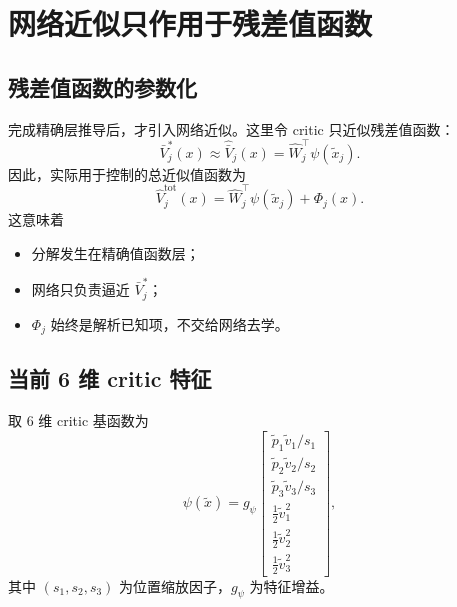 \documentclass[11pt,a4paper]{article}
\begin{document}
\section{网络近似只作用于残差值函数}

\subsection{残差值函数的参数化}

完成精确层推导后，才引入网络近似。这里令 critic 只近似残差值函数：
\begin{equation}
\bar V_j^*(x)\approx \hat{\bar V}_j(x)=\hat W_j^\top \psi(\tilde x_j).
\label{eq:residual_value_approx}
\end{equation}
因此，实际用于控制的总近似值函数为
\begin{equation}
\hat V_j^{\mathrm{tot}}(x)=\hat W_j^\top\psi(\tilde x_j)+\Phi_j(x).
\end{equation}
这意味着
\begin{itemize}
\item 分解发生在精确值函数层；
\item 网络只负责逼近 $\bar V_j^*$；
\item $\Phi_j$ 始终是解析已知项，不交给网络去学。
\end{itemize}

\subsection{当前 6 维 critic 特征}

取 6 维 critic 基函数为
\begin{equation}
\psi(\tilde x)
=
g_\psi
\begin{bmatrix}
\tilde p_1\tilde v_1/s_1\\
\tilde p_2\tilde v_2/s_2\\
\tilde p_3\tilde v_3/s_3\\
\frac{1}{2}\tilde v_1^2\\
\frac{1}{2}\tilde v_2^2\\
\frac{1}{2}\tilde v_3^2
\end{bmatrix},
\label{eq:feature_map}
\end{equation}
其中 $(s_1,s_2,s_3)$ 为位置缩放因子，$g_\psi$ 为特征增益。
\end{document}

